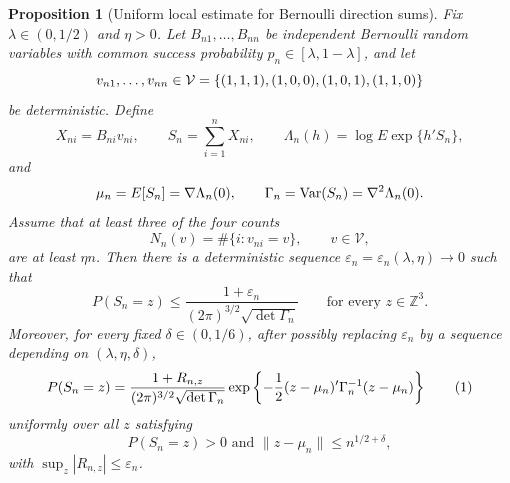 \documentclass[12pt,reqno]{amsart}
\theoremstyle{theorem}
\newtheorem{prop}{Proposition}[section]
\theoremstyle{definition}
\newcommand\numberthis{\addtocounter{equation}{1}\tag{\theequation}}
\newcommand{\Var}{\mathop{}\!\textnormal{Var}}
\newcommand{\0}{\mathbf{0}}
\newcommand{\1}{\mathbf{1}}
\begin{document}
\begin{prop}[Uniform local estimate for Bernoulli direction sums]\label{prop:lattice}
Fix \(\lambda\in(0,1/2)\) and \(\eta>0\).  Let
\(B_{n1},\ldots,B_{nn}\) be independent Bernoulli random variables with common
success probability \(p_n\in[\lambda,1-\lambda]\), and let
\[v_{n1},\ldots,v_{nn}\in\mathcal V = \left\{{(1,1,1), (1,0,0), (1,0,1), (1,1,0)}\right\}\]
be deterministic. Define
\[
X_{ni}=B_{ni}v_{ni},\qquad
S_n=\sum_{i=1}^nX_{ni},\qquad
\Lambda_n(h)=\log E\exp\{h'S_n\},
\]
and
\[
\mu_n=E[S_n]=\nabla\Lambda_n(0),\qquad
\Gamma_n = \Var(S_n) =\nabla^2\Lambda_n(0).
\]
Assume that at least three of the four counts
\[
N_n(v)=\#\{i:v_{ni}=v\},\qquad v\in\mathcal V,
\]
are at least \(\eta n\).  Then there is a deterministic sequence
\(\varepsilon_n=\varepsilon_n(\lambda,\eta)\to0\) such that
\[
P(S_n=z)
\le
\frac{1+\varepsilon_n}{(2\pi)^{3/2}\sqrt{\det\Gamma_n}}
\qquad\text{for every }z\in\mathbb Z^3.
\]
Moreover, for every fixed \(\delta\in(0,1/6)\), after possibly replacing
\(\varepsilon_n\) by a sequence depending on \((\lambda,\eta,\delta)\),
\[
P(S_n=z)
=
\frac{1+R_{n,z}}{(2\pi)^{3/2}\sqrt{\det\Gamma_n}}
\exp\left\{-\frac12(z-\mu_n)'\Gamma_n^{-1}(z-\mu_n)\right\} \numberthis
\label{eq:localexpansion}
\]
uniformly over all \(z\) satisfying
\[
P(S_n=z) > 0 \text{ and } \|z-\mu_n\|\le n^{1/2+\delta},
\]
with \(\sup_z |R_{n,z}|\le\varepsilon_n\).
\end{prop}
\end{document}
